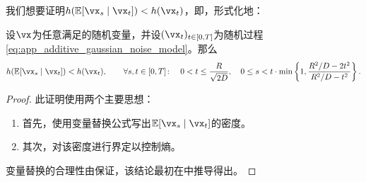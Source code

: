 \documentclass[../../book-main_zh.tex]{subfiles}
\begin{document}
我们想要证明\(h(\Ex[\vx_{s} \mid \vx_{t}]) < h(\vx_{t})\)，即，形式化地：
\begin{theorem}\label{thm:conditioning_reduces_entropy}
    设\(\vx\)为任意满足的随机变量，并设\((\vx_{t})_{t \in [0, T]}\)为随机过程\eqref{eq:app_additive_gaussian_noise_model}。那么
    \begin{equation}
        h(\Ex[\vx_{s} \mid \vx_{t}]) < h(\vx_{t}), \qquad \forall s, t \in [0, T] \colon \quad 0 < t \leq \frac{R}{\sqrt{2D}}, \quad 0 \leq s  < t\cdot\min\bc{1, \frac{R^{2}/D - 2t^{2}}{R^{2}/D - t^{2}}}.
    \end{equation}
\end{theorem}
\begin{proof}
    此证明使用两个主要思想：
    \begin{enumerate}
        \item 首先，使用变量替换公式写出\(\Ex[\vx_{s} \mid \vx_{t}]\)的密度。
        \item 其次，对该密度进行界定以控制熵。
    \end{enumerate}
    变量替换的合理性由保证，该结论最初在\cite{Gribonval2011-pf}中推导得出。


\end{proof}
\end{document}
